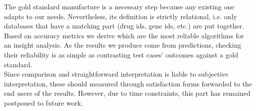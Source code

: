 The gold standard manufacture is a necessary step because any existing one adapts to our needs. Nevertheless, its definition is strictly relational, i.e. only databases that have a matching part (drug ids, gene ids, etc.) are put together.
\\

Based on accuracy metrics we derive which are the most reliable algorithms for an insight analysis. As the results we produce come from predictions, checking their reliability is as simple as contrasting test cases’ outcomes against a gold standard.
\\

Since comparison and straightforward interpretation is liable to subjective interpretation, these should measured through satisfaction forms forwarded to the end users of the results. However, due to time constraints, this part has remained postponed to future work.
